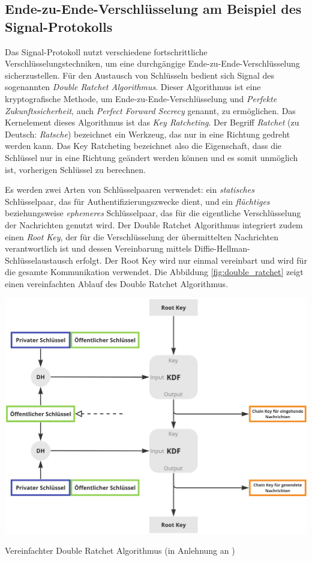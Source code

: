 \subsection{Ende-zu-Ende-Verschlüsselung am Beispiel des Signal-Protokolls}
\label{subsec:signal_protokoll_basics}

Das Signal-Protokoll nutzt verschiedene fortschrittliche Verschlüsselungstechniken, um eine durchgängige Ende-zu-Ende-Verschlüsselung sicherzustellen. Für den Austausch von Schlüsseln bedient sich Signal des sogenannten \textit{Double Ratchet Algorithmus}. Dieser Algorithmus ist eine kryptografische Methode, um Ende-zu-Ende-Verschlüsselung und \textit{Perfekte Zukunftssicherheit}, auch \textit{Perfect Forward Secrecy} genannt, zu ermöglichen. Das Kernelement dieses Algorithmus ist das \textit{Key Ratcheting}. Der Begriff \textit{Ratchet} (zu Deutsch: \textit{Ratsche}) bezeichnet ein Werkzeug, das nur in eine Richtung gedreht werden kann. Das Key Ratcheting bezeichnet also die Eigenschaft, dass die Schlüssel nur in eine Richtung geändert werden können und es somit unmöglich ist, vorherigen Schlüssel zu berechnen.

Es werden zwei Arten von Schlüsselpaaren verwendet: ein \textit{statisches} Schlüsselpaar, das für Authentifizierungszwecke dient, und ein \textit{flüchtiges} beziehungsweise \textit{ephemeres} Schlüsselpaar, das für die eigentliche Verschlüsselung der Nachrichten genutzt wird. Der Double Ratchet Algorithmus integriert zudem einen \textit{Root Key}, der für die Verschlüsselung der übermittelten Nachrichten verantwortlich ist und dessen Vereinbarung mittels Diffie-Hellman-Schlüsselaustausch erfolgt. Der Root Key wird nur einmal vereinbart und wird für die gesamte Kommunikation verwendet. Die Abbildung \ref{fig:double_ratchet} zeigt einen vereinfachten Ablauf des Double Ratchet Algorithmus.


\begin{center}
    \captionsetup{type=figure}
    \includegraphics[width=0.8\linewidth]{images/double_ratchet_altered.png}
    \caption{Vereinfachter Double Ratchet Algorithmus (in Anlehnung an \cite{Signal_DoubleRatchet})}
    \label{fig:double_ratchet}
\end{center}


